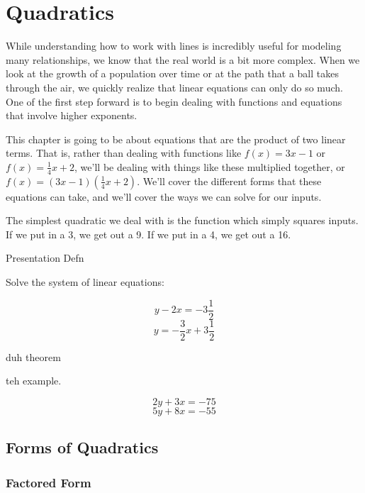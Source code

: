 \chapter{Quadratics}

While understanding how to work with lines is incredibly useful for modeling many relationships, we know that the real world is a bit more complex.  When we look at the growth of a population over time or at the path that a ball takes through the air, we quickly realize that linear equations can only do so much.  One of the first step forward is to begin dealing with functions and equations that involve higher exponents.  

This chapter is going to be about equations that are the product of two linear terms.  That is, rather than dealing with functions like $f(x) = 3x - 1$ or $f(x) = \frac{1}{4}x + 2$, we'll be dealing with things like these multiplied together, or $f(x) = (3x-1)(\frac{1}{4}x + 2)$.  We'll cover the different forms that these equations can take, and we'll cover the ways we can solve for our inputs.

The simplest quadratic we deal with is the function which simply squares inputs.  If we put in a 3, we get out a 9.  If we put in a 4, we get out a 16.


\begin{presentation}
	\begin{defn}
	Presentation Defn
	\end{defn}
\end{presentation}

\begin{prblm}
	Solve the system of linear equations:
	
	$$y -2x = -3\frac{1}{2}$$
	$$y = -\frac{3}{2}x + 3\frac{1}{2}$$
\end{prblm}

\begin{theorem}
duh theorem
\end{theorem}

\begin{example}
teh example.
\end{example}

$$2y + 3x = -75$$
$$5y + 8x = -55$$


\section*{Forms of Quadratics}

\subsection*{Factored Form}

